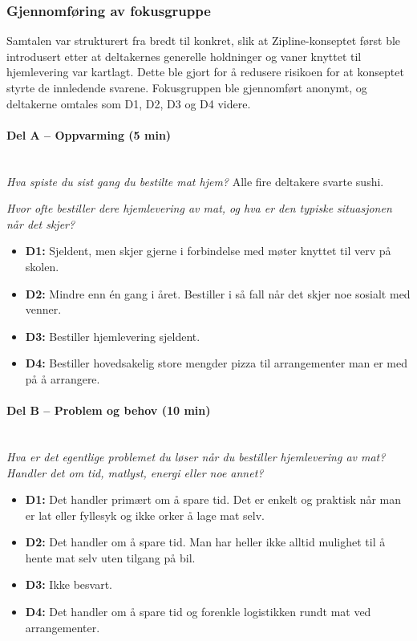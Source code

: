 \subsubsection*{Gjennomføring av fokusgruppe}

Samtalen var strukturert fra bredt til konkret, slik at Zipline-konseptet
først ble introdusert etter at deltakernes generelle holdninger og vaner
knyttet til hjemlevering var kartlagt. Dette ble gjort for å redusere
risikoen for at konseptet styrte de innledende svarene. Fokusgruppen ble
gjennomført anonymt, og deltakerne omtales som D1, D2, D3 og D4 videre.

\paragraph{Del A -- Oppvarming (5 min)}\mbox{}\\
\textit{Hva spiste du sist gang du bestilte mat hjem?} Alle fire deltakere
svarte sushi.

\textit{Hvor ofte bestiller dere hjemlevering av mat, og hva er den typiske
situasjonen når det skjer?}
\begin{itemize}[leftmargin=1.5em, nosep]
  \item \textbf{D1:} Sjeldent, men skjer gjerne i forbindelse med møter
  knyttet til verv på skolen.
  \item \textbf{D2:} Mindre enn én gang i året. Bestiller i så fall når det
  skjer noe sosialt med venner.
  \item \textbf{D3:} Bestiller hjemlevering sjeldent.
  \item \textbf{D4:} Bestiller hovedsakelig store mengder pizza til
  arrangementer man er med på å arrangere.
\end{itemize}

\paragraph{Del B -- Problem og behov (10 min)}\mbox{}\\
\textit{Hva er det egentlige problemet du løser når du bestiller hjemlevering
av mat? Handler det om tid, matlyst, energi eller noe annet?}
\begin{itemize}[leftmargin=1.5em, nosep]
  \item \textbf{D1:} Det handler primært om å spare tid. Det er enkelt
  og praktisk når man er lat eller fyllesyk og ikke orker å lage mat selv.
  \item \textbf{D2:} Det handler om å spare tid. Man har heller ikke alltid
  mulighet til å hente mat selv uten tilgang på bil.
  \item \textbf{D3:} Ikke besvart.
  \item \textbf{D4:} Det handler om å spare tid og forenkle
  logistikken rundt mat ved arrangementer.
\end{itemize}

